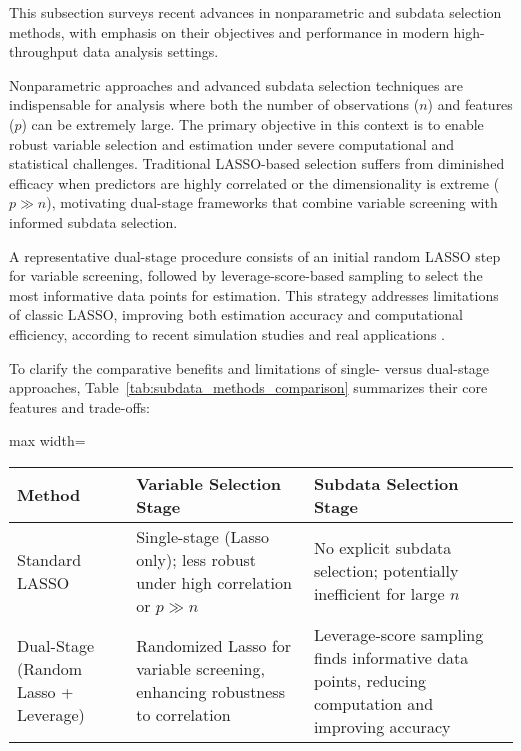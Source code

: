 \documentclass[sigconf]{acmart}
\begin{document}
This subsection surveys recent advances in nonparametric and subdata selection methods, with emphasis on their objectives and performance in modern high-throughput data analysis settings.

Nonparametric approaches and advanced subdata selection techniques are indispensable for analysis where both the number of observations ($n$) and features ($p$) can be extremely large. The primary objective in this context is to enable robust variable selection and estimation under severe computational and statistical challenges. Traditional LASSO-based selection suffers from diminished efficacy when predictors are highly correlated or the dimensionality is extreme ($p \gg n$), motivating dual-stage frameworks that combine variable screening with informed subdata selection.

A representative dual-stage procedure consists of an initial random LASSO step for variable screening, followed by leverage-score-based sampling to select the most informative data points for estimation. This strategy addresses limitations of classic LASSO, improving both estimation accuracy and computational efficiency, according to recent simulation studies and real applications \cite{ref102,ref100}.

To clarify the comparative benefits and limitations of single- versus dual-stage approaches, Table~\ref{tab:subdata_methods_comparison} summarizes their core features and trade-offs:

\begin{table*}[htbp]
\centering
\caption{Comparison of Traditional and Dual-Stage Subdata Selection Methods}
\label{tab:subdata_methods_comparison}
\begin{adjustbox}{max width=\textwidth}
\begin{tabular}{lll}
\toprule
\textbf{Method} & \textbf{Variable Selection Stage} & \textbf{Subdata Selection Stage} \\
\midrule
Standard LASSO & Single-stage (Lasso only); less robust under high correlation or $p \gg n$ & No explicit subdata selection; potentially inefficient for large $n$ \\
Dual-Stage (Random Lasso + Leverage) & Randomized Lasso for variable screening, enhancing robustness to correlation & Leverage-score sampling finds informative data points, reducing computation and improving accuracy \\
\bottomrule
\end{tabular}
\end{adjustbox}
\end{table*}
\end{document}
